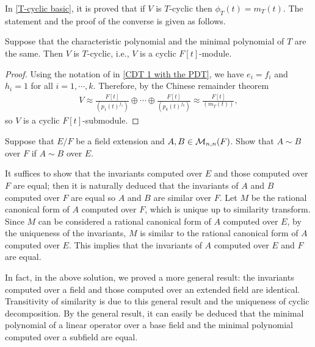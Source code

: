 In \cref{T-cyclic basic}, it is proved that if $V$ is $T$-cyclic then $\phi_T(t)=m_T(t)$.
The statement and the proof of the converse is given as follows.
\begin{prop}\label{char_poly and min_poly are the same implies cyclicity}
    Suppose that the characteristic polynomial and the minimal polynomial of $T$ are the same.
    Then $V$ is $T$-cyclic, i.e., $V$ is a cyclic $F[t]$-module.
\end{prop}
\begin{proof}
    Using the notation of in \cref{CDT 1 with the PDT}, we have $e_i=f_i$ and $h_i=1$ for all $i=1, \cdots, k$.
    Therefore, by the Chinese remainder theorem
    \begin{align*}
        V\approx \frac{F[t]}{(p_1(t)^{f_1})}\oplus\cdots\oplus \frac{F[t]}{(p_k(t)^{f_k})}\approx \frac{F[t]}{(m_T(t))},
    \end{align*}
    so $V$ is a cyclic $F[t]$-submodule.
\end{proof}

\begin{prob}
    Suppose that $E/F$ be a field extension and $A, B\in{\mathcal{M}}_{n, n}(F)$.
    Show that $A\sim B$ over $F$ if $A\sim B$ over $E$.
\end{prob}
\begin{sol}
    It suffices to show that the invariants computed over $E$ and those computed over $F$ are equal; then it is naturally deduced that the invariants of $A$ and $B$ computed over $F$ are equal so $A$ and $B$ are similar over $F$.
    Let $M$ be the rational canonical form of $A$ computed over $F$, which is unique up to similarity transform.
    Since $M$ can be considered a rational canonical form of $A$ computed over $E$, by the uniqueness of the invariants, $M$ is similar to the rational canonical form of $A$ computed over $E$.
    This implies that the invariants of $A$ computed over $E$ and $F$ are equal.
\end{sol}
\begin{rmk}
    In fact, in the above solution, we proved a more general result: the invariants computed over a field and those computed over an extended field are identical.
    Transitivity of similarity is due to this general result and the uniqueness of cyclic decomposition.
    By the general result, it can easily be deduced that the minimal polynomial of a linear operator over a base field and the minimal polynomial computed over a subfield are equal.
\end{rmk}

